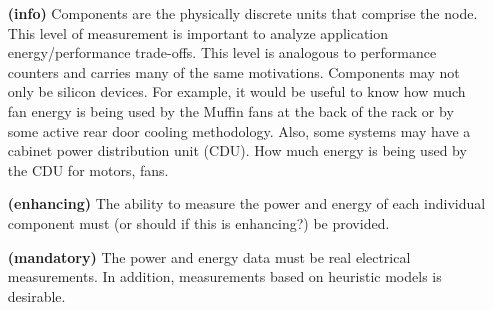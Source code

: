 \begin{itemize}

\item[\textbf{(info)}]
Components are the physically discrete units that comprise the node. This level of measurement 
is important to analyze application energy/performance trade-offs. This level is analogous 
to performance counters and carries many of the same motivations.  Components may not 
only be silicon devices.  For example, it would be useful to know how much fan energy is 
being used by the Muffin fans at the back of the rack or by some active rear door cooling 
methodology.  Also, some systems may have a cabinet power distribution unit (CDU).  How 
much energy is being used by the CDU for motors, fans.
	
\item[\textbf{(enhancing)}]
The ability to measure the power and energy of each individual component must 
(or should if this is enhancing?) be provided.
	
\item[\textbf{(mandatory)}]
The power and energy data must be real electrical measurements. In addition, 
measurements based on heuristic models is desirable. 
\end{itemize}


